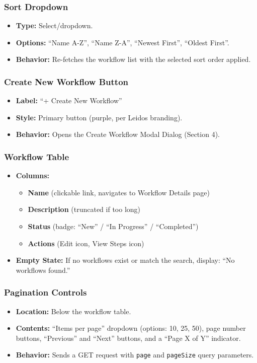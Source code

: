 \documentclass[12pt]{article}
\begin{document}
\subsubsection{Sort Dropdown}
\begin{itemize}
    \item \textbf{Type:} Select/dropdown.
    \item \textbf{Options:} ``Name A-Z'', ``Name Z-A'', ``Newest First'', ``Oldest First''.
    \item \textbf{Behavior:} Re-fetches the workflow list with the selected sort order applied.
\end{itemize}

\subsubsection{Create New Workflow Button}
\begin{itemize}
    \item \textbf{Label:} ``+ Create New Workflow''
    \item \textbf{Style:} Primary button (purple, per Leidos branding).
    \item \textbf{Behavior:} Opens the Create Workflow Modal Dialog (Section 4).
\end{itemize}

\subsubsection{Workflow Table}
\begin{itemize}
    \item \textbf{Columns:}
    \begin{itemize}
        \item \textbf{Name} (clickable link, navigates to Workflow Details page)
        \item \textbf{Description} (truncated if too long)
        \item \textbf{Status} (badge: ``New'' / ``In Progress'' / ``Completed'')
        \item \textbf{Actions} (Edit icon, View Steps icon)
    \end{itemize}
    \item \textbf{Empty State:} If no workflows exist or match the search, display: ``No
    workflows found.''
\end{itemize}

\subsubsection{Pagination Controls}
\begin{itemize}
    \item \textbf{Location:} Below the workflow table.
    \item \textbf{Contents:} ``Items per page'' dropdown (options: 10, 25, 50), page number
    buttons, ``Previous'' and ``Next'' buttons, and a ``Page X of Y'' indicator.
    \item \textbf{Behavior:} Sends a GET request with \texttt{page} and \texttt{pageSize}
    query parameters.
\end{itemize}
\end{document}
